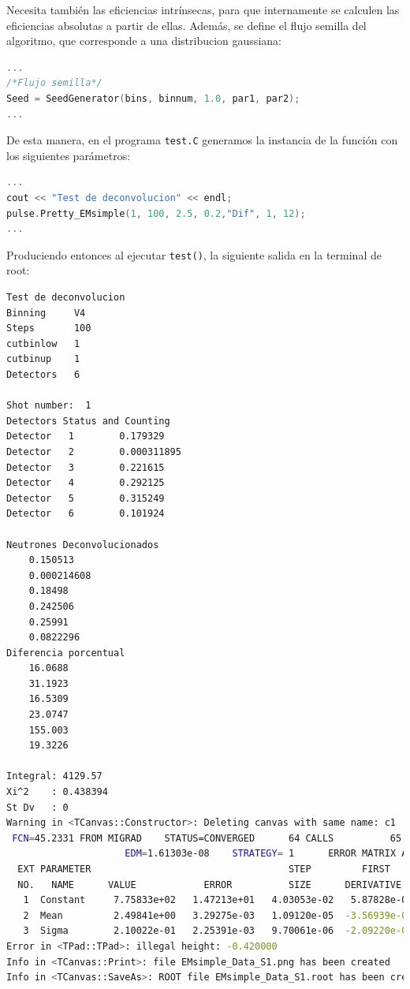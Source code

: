 \documentclass[11pt,letterpaper]{article}
\begin{document}
Necesita también las eficiencias intrínsecas, para que internamente se calculen las eficiencias absolutas a partir de ellas. Además, se define el flujo semilla del algoritmo, que corresponde a una distribucion gaussiana:

\begin{lstlisting}[language=C++]
...
/*Flujo semilla*/
Seed = SeedGenerator(bins, binnum, 1.0, par1, par2); 
...
\end{lstlisting}

De esta manera, en el programa \verb|test.C| generamos la instancia de la función con los siguientes parámetros:

\begin{lstlisting}[language=C++]
...
cout << "Test de deconvolucion" << endl;
pulse.Pretty_EMsimple(1, 100, 2.5, 0.2,"Dif", 1, 12);
...
\end{lstlisting}

Produciendo entonces al ejecutar \verb|test()|, la siguiente salida en la terminal de root: 

\begin{lstlisting}[language=bash]
Test de deconvolucion
Binning		V4
Steps		100
cutbinlow	1
cutbinup	1
Detectors	6

Shot number:  1
Detectors Status and Counting
Detector   1		0.179329
Detector   2		0.000311895
Detector   3		0.221615
Detector   4		0.292125
Detector   5		0.315249
Detector   6		0.101924

Neutrones Deconvolucionados
	0.150513
	0.000214608
	0.18498
	0.242506
	0.25991
	0.0822296
Diferencia porcentual
	16.0688
	31.1923
	16.5309
	23.0747
	155.003
	19.3226

Integral: 4129.57
Xi^2	: 0.438394
St Dv	: 0
Warning in <TCanvas::Constructor>: Deleting canvas with same name: c1
 FCN=45.2331 FROM MIGRAD    STATUS=CONVERGED      64 CALLS          65 TOTAL
                     EDM=1.61303e-08    STRATEGY= 1      ERROR MATRIX ACCURATE 
  EXT PARAMETER                                   STEP         FIRST   
  NO.   NAME      VALUE            ERROR          SIZE      DERIVATIVE 
   1  Constant     7.75833e+02   1.47213e+01   4.03053e-02   5.87828e-06
   2  Mean         2.49841e+00   3.29275e-03   1.09120e-05  -3.56939e-02
   3  Sigma        2.10022e-01   2.25391e-03   9.70061e-06  -2.09220e-02
Error in <TPad::TPad>: illegal height: -0.420000
Info in <TCanvas::Print>: file EMsimple_Data_S1.png has been created
Info in <TCanvas::SaveAs>: ROOT file EMsimple_Data_S1.root has been created
\end{lstlisting}
\end{document}
